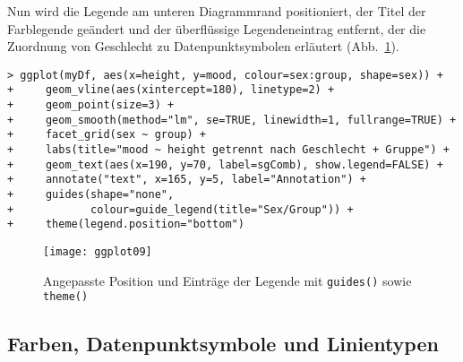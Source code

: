 Nun wird die Legende am unteren Diagrammrand positioniert, der Titel der Farblegende geändert und der überflüssige Legendeneintrag entfernt, der die Zuordnung von Geschlecht zu Datenpunktsymbolen erläutert (Abb.\ \ref{fig:ggplot09}).
\begin{lstlisting}
> ggplot(myDf, aes(x=height, y=mood, colour=sex:group, shape=sex)) +
+     geom_vline(aes(xintercept=180), linetype=2) +
+     geom_point(size=3) +
+     geom_smooth(method="lm", se=TRUE, linewidth=1, fullrange=TRUE) +
+     facet_grid(sex ~ group) +
+     labs(title="mood ~ height getrennt nach Geschlecht + Gruppe") +
+     geom_text(aes(x=190, y=70, label=sgComb), show.legend=FALSE) +
+     annotate("text", x=165, y=5, label="Annotation") +
+     guides(shape="none",
+            colour=guide_legend(title="Sex/Group")) +
+     theme(legend.position="bottom")
\end{lstlisting}

\begin{figure}[ht]
\centering
\texttt{[image: ggplot09]}
\vspace*{-0.5em}
\caption{Angepasste Position und Einträge der Legende mit \lstinline!guides()! sowie \lstinline!theme()!}
\label{fig:ggplot09}
\end{figure}

\subsection{Farben, Datenpunktsymbole und Linientypen}
\label{sec:ggplotColour}

